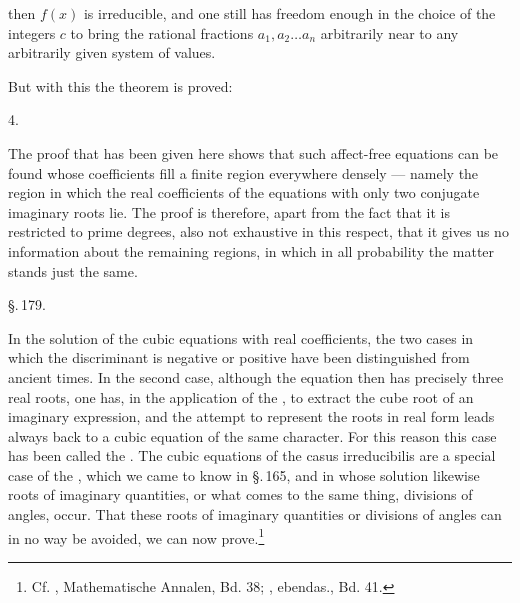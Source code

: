 then $f(x)$ is irreducible, and one still has freedom enough in the choice of the integers $c$ to bring the rational fractions $a_1, a_2 \ldots a_n$ arbitrarily near to any arbitrarily given system of values.

But with this the theorem is proved:

4. 

The proof that has been given here shows that such affect-free equations can be found whose coefficients fill a finite region everywhere densely — namely the region in which the real coefficients of the equations with only two
conjugate imaginary roots lie. The proof is therefore, apart from the fact that it is restricted to prime degrees, also not exhaustive in this respect, that it gives us no information about the remaining regions, in which in all probability the matter stands just the same.

\begin{center}
\S.\,179.

\end{center}

In the solution of the cubic equations with real coefficients, the two cases in which the discriminant is negative or positive have been distinguished from ancient times. In the second case, although the equation then has precisely three real roots, one has, in the application of the , to extract the cube root of an imaginary expression, and the attempt to represent the roots in real form leads always back to a cubic equation of the same character. For this reason this case has been called the . The cubic equations of the casus irreducibilis are a special case of the , which we came to know in \S.\,165, and in whose solution likewise roots of imaginary quantities, or what comes to the same thing, divisions of angles, occur. That these roots of imaginary quantities or divisions of angles can in no way be avoided, we can now prove.\footnote{Cf. , Mathematische Annalen, Bd. 38; , ebendas., Bd. 41.}
